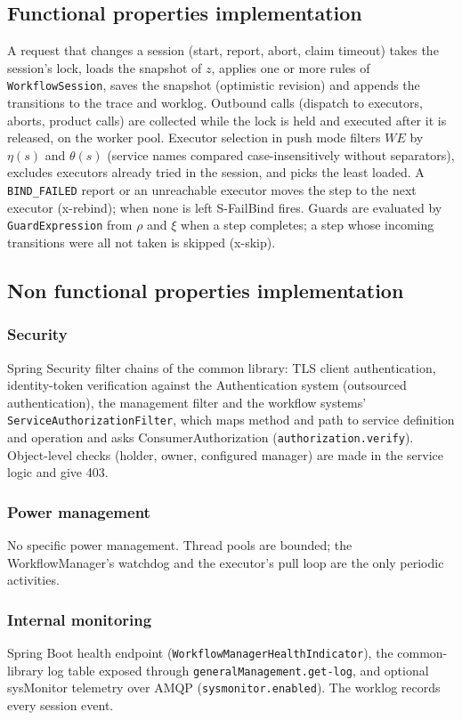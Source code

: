 \documentclass[a4paper]{arrowhead}
\begin{document}
\subsection{Functional properties implementation}
A request that changes a session (start, report, abort, claim timeout) takes the session's lock, loads the
snapshot of $z$, applies one or more rules of \texttt{WorkflowSession}, saves the snapshot (optimistic revision) and
appends the transitions to the trace and worklog. Outbound calls (dispatch to executors, aborts, product calls) are
collected while the lock is held and executed after it is released, on the worker pool. Executor selection in push mode
filters $WE$ by $\eta(s)$ and $\theta(s)$ (service names compared case-insensitively without separators), excludes
executors already tried in the session, and picks the least loaded. A \texttt{BIND\_FAILED} report or an unreachable
executor moves the step to the next executor (x-rebind); when none is left S-FailBind fires. Guards are evaluated by
\texttt{GuardExpression} from $\rho$ and $\xi$ when a step completes; a step whose incoming transitions were all not
taken is skipped (x-skip).

\subsection{Non functional properties implementation}
\subsubsection{Security}
Spring Security filter chains of the common library: TLS client authentication, identity-token verification against
the Authentication system (outsourced authentication), the management filter and the workflow systems'
\texttt{ServiceAuthorizationFilter}, which maps method and path to service definition and operation and asks
ConsumerAuthorization (\texttt{authorization.verify}). Object-level checks (holder, owner, configured manager) are made in
the service logic and give 403.
\subsubsection{Power management}
No specific power management. Thread pools are bounded; the WorkflowManager's watchdog and the executor's pull loop are
the only periodic activities.
\subsubsection{Internal monitoring}
Spring Boot health endpoint (\texttt{WorkflowManagerHealthIndicator}),
the common-library log table exposed through \texttt{generalManagement.get-log}, and optional sysMonitor telemetry over
AMQP (\texttt{sysmonitor.enabled}). The worklog records every session event.
\end{document}
